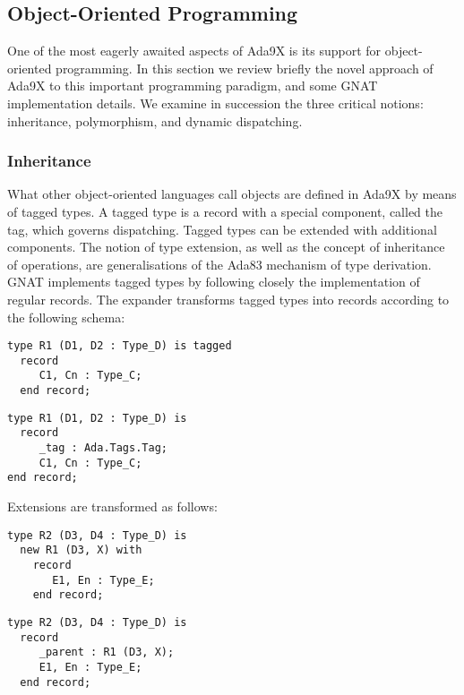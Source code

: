 \subsection{Object-Oriented Programming}

One of the most eagerly awaited aspects of Ada9X is its support for
object-oriented programming. In this section we review briefly the novel
approach of Ada9X to this important programming paradigm, and some GNAT
implementation details. We examine in succession the three critical
notions: inheritance, polymorphism,  and dynamic
dispatching. 

\subsubsection{\label{inher}Inheritance}

What other object-oriented languages call objects are defined in Ada9X 
by means of tagged types. A tagged type is a record with a special component,
called the tag, which governs dispatching. Tagged types can be extended
with additional components. The notion of type extension, as well as the
concept of inheritance of operations, are generalisations
of the Ada83 mechanism of type derivation.  GNAT implements tagged types
by following closely the implementation of regular records. The expander
transforms tagged types into records according to the following schema:

\begin{center}
\begin{minipage}{3in}
\begin{verbatim}
type R1 (D1, D2 : Type_D) is tagged
  record
     C1, Cn : Type_C;
  end record;

\end{verbatim}
\end{minipage}
\hskip 1cm
\begin{minipage}{2.5in}
\begin{verbatim}
type R1 (D1, D2 : Type_D) is
  record
     _tag : Ada.Tags.Tag;
     C1, Cn : Type_C;
end record;
\end{verbatim}
\end{minipage}
\end{center}
%
Extensions are transformed as follows:
%
\begin{center}
\begin{minipage}{3in}
\begin{verbatim}
type R2 (D3, D4 : Type_D) is
  new R1 (D3, X) with
    record
       E1, En : Type_E;
    end record;
\end{verbatim}
\end{minipage}
\begin{minipage}{2.5in}
\begin{verbatim}
type R2 (D3, D4 : Type_D) is
  record
     _parent : R1 (D3, X);
     E1, En : Type_E;
  end record;
\end{verbatim}
\end{minipage}
\end{center}


